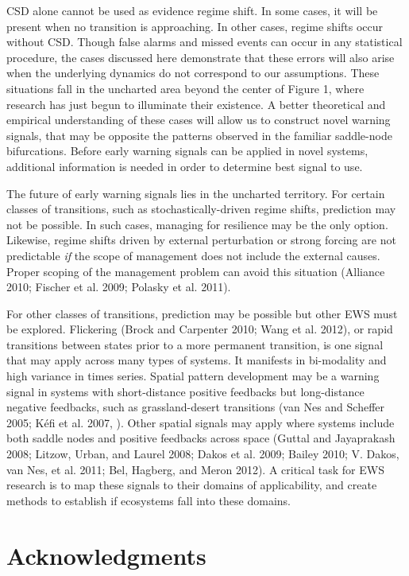 \documentclass[author-year, review]{elsarticle} %
\begin{document}
CSD alone cannot be used as evidence regime shift. In some cases, it
will be present when no transition is approaching. In other cases,
regime shifts occur without CSD. Though false alarms and missed events
can occur in any statistical procedure, the cases discussed here
demonstrate that these errors will also arise when the underlying
dynamics do not correspond to our assumptions. These situations fall in
the uncharted area beyond the center of Figure 1, where research has
just begun to illuminate their existence. A better theoretical and
empirical understanding of these cases will allow us to construct novel
warning signals, that may be opposite the patterns observed in the
familiar saddle-node bifurcations. Before early warning signals can be
applied in novel systems, additional information is needed in order to
determine best signal to use.

The future of early warning signals lies in the uncharted territory. For
certain classes of transitions, such as stochastically-driven regime
shifts, prediction may not be possible. In such cases, managing for
resilience may be the only option. Likewise, regime shifts driven by
external perturbation or strong forcing are not predictable \emph{if}
the scope of management does not include the external causes. Proper
scoping of the management problem can avoid this situation (Alliance
2010; Fischer et al. 2009; Polasky et al. 2011).

For other classes of transitions, prediction may be possible but other
EWS must be explored. Flickering (Brock and Carpenter 2010; Wang et al.
2012), or rapid transitions between states prior to a more permanent
transition, is one signal that may apply across many types of systems.
It manifests in bi-modality and high variance in times series. Spatial
pattern development may be a warning signal in systems with
short-distance positive feedbacks but long-distance negative feedbacks,
such as grassland-desert transitions (van Nes and Scheffer 2005; Kéfi et
al. 2007, ). Other spatial signals may apply where systems include both
saddle nodes and positive feedbacks across space (Guttal and Jayaprakash
2008; Litzow, Urban, and Laurel 2008; Dakos et al. 2009; Bailey 2010; V.
Dakos, van Nes, et al. 2011; Bel, Hagberg, and Meron 2012). A critical
task for EWS research is to map these signals to their domains of
applicability, and create methods to establish if ecosystems fall into
these domains.

\section{Acknowledgments}
\end{document}
